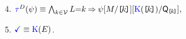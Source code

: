 \begin{minipage}[t]{.56\textwidth}
  \begin{enumerate}[topsep=0pt,label=(\textsc{w}\arabic*),ref=\textsc{w}\arabic*]
    \setcounter{enumi}{3}
  \item \label{write-tau-addr}
    \begin{math}
      \aTr{\bEvs}{\bForm} \riff 
      \textstyle\bigwedge_{\dVal\in\Val}
      \cExp{=}\dVal
      \limplies
        \bForm
        [\aExp/\REF{\dVal}]
        [\kappaE{\REF{\dVal}}/\Q{\REF{\dVal}}],
      \end{math}
  \item \label{write-term-addr}
    $\aTerm \riff \kappaE{}$.
  \end{enumerate}
\end{minipage}

